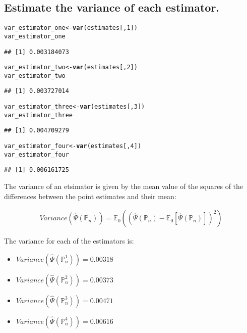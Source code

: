 \documentclass{article}\usepackage[]{graphicx}\usepackage[]{xcolor}
\makeatletter
\newcommand{\hlnum}[1]{\textcolor[rgb]{0.686,0.059,0.569}{#1}}%
\newcommand{\hlstd}[1]{\textcolor[rgb]{0.345,0.345,0.345}{#1}}%
\newcommand{\hlkwb}[1]{\textcolor[rgb]{0.69,0.353,0.396}{#1}}%
\newcommand{\hlkwd}[1]{\textcolor[rgb]{0.737,0.353,0.396}{\textbf{#1}}}%
\newenvironment{kframe}{%
 \def\at@end@of@kframe{}%
 \ifinner\ifhmode%
  \def\at@end@of@kframe{\end{minipage}}%
  \begin{minipage}{\columnwidth}%
 \fi\fi%
 \def\FrameCommand##1{\hskip\@totalleftmargin \hskip-\fboxsep
 \colorbox{shadecolor}{##1}\hskip-\fboxsep
     \hskip-\linewidth \hskip-\@totalleftmargin \hskip\columnwidth}%
 \MakeFramed {\advance\hsize-\width
   \@totalleftmargin\z@ \linewidth\hsize
   \@setminipage}}%
 {\par\unskip\endMakeFramed%
 \at@end@of@kframe}
\newenvironment{knitrout}{}{} %
\makeatother
\begin{document}
  
  \subsection{Estimate the variance of each estimator.}
  
\begin{knitrout}
\color{fgcolor}\begin{kframe}
\begin{alltt}
\hlstd{var_estimator_one} \hlkwb{<-} \hlkwd{var}\hlstd{(estimates[,}\hlnum{1}\hlstd{])}
\hlstd{var_estimator_one}
\end{alltt}
\begin{verbatim}
## [1] 0.003184073
\end{verbatim}
\begin{alltt}
\hlstd{var_estimator_two} \hlkwb{<-} \hlkwd{var}\hlstd{(estimates[,}\hlnum{2}\hlstd{])}
\hlstd{var_estimator_two}
\end{alltt}
\begin{verbatim}
## [1] 0.003727014
\end{verbatim}
\begin{alltt}
\hlstd{var_estimator_three} \hlkwb{<-} \hlkwd{var}\hlstd{(estimates[,}\hlnum{3}\hlstd{])}
\hlstd{var_estimator_three}
\end{alltt}
\begin{verbatim}
## [1] 0.004709279
\end{verbatim}
\begin{alltt}
\hlstd{var_estimator_four} \hlkwb{<-} \hlkwd{var}\hlstd{(estimates[,}\hlnum{4}\hlstd{])}
\hlstd{var_estimator_four}
\end{alltt}
\begin{verbatim}
## [1] 0.006161725
\end{verbatim}
\end{kframe}
\end{knitrout}
  
The variance of an etsimator is given by the mean value of the squares of the differences between the point estimates and their mean:

\begin{align*}
Variance(\hat{\Psi}(\mathbb{P}_n))=\mathbb{E}_0((\hat{\Psi}(\mathbb{P}_n)-\mathbb{E}_0[\hat{\Psi}(\mathbb{P}_n)])^2)
\end{align*}

The variance for each of the estimators is:

\begin{itemize}

  \item $Variance(\hat{\Psi}(\mathbb{P}_n^1))=0.00318$
  \item $Variance(\hat{\Psi}(\mathbb{P}_n^2))=0.00373$
  \item $Variance(\hat{\Psi}(\mathbb{P}_n^3))=0.00471$
  \item $Variance(\hat{\Psi}(\mathbb{P}_n^4))=0.00616$

\end{itemize}
\end{document}
